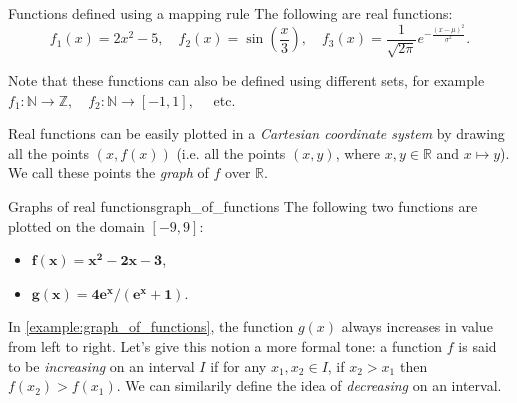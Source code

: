 \begin{example}{Functions defined using a mapping rule}{}
	The following are real functions:
	\[
		f_{1}(x) = 2x^{2}-5,\quad f_{2}(x)=\sin\left( \frac{x}{3} \right),\quad f_{3}(x)=\frac{1}{\sqrt{2\pi}}e^{-\frac{(x-\mu)^{2}}{\sigma^{2}}}.
	\]

	Note that these functions can also be defined using different sets, for example $f_{1}:\mathbb{N}\to\mathbb{Z},\quad f_{2}:\mathbb{N}\to[-1,1],\quad$ etc.
\end{example}

Real functions can be easily plotted in a \emph{Cartesian coordinate system} by drawing all the points $\left( x,f(x) \right)$ (i.e. all the points $\left( x,y \right)$, where $x,y\in\mathbb{R}$ and $x\mapsto y$). We call these points the \emph{graph} of $f$ over $\mathbb{R}$.

\begin{example}{Graphs of real functions}{graph_of_functions}
	The following two functions are plotted on the domain $\left[ -9,9 \right]$:

	\begin{minipage}{0.35\textwidth}
		\begin{itemize}
			\item \textcolor{xred}{$\bm{f(x)=x^{2}-2x-3}$},
			\item \textcolor{xgreen}{$\bm{g(x)=4e^{x}/\left( e^{x}+1 \right)}$}.
		\end{itemize}
	\end{minipage}%
	\begin{minipage}[c]{0.65\textwidth}
		\centering
	\end{minipage}
\end{example}

In \autoref{example:graph_of_functions}, the function $g(x)$ always increases in value from left to right. Let's give this notion a more formal tone: a function $f$ is said to be \emph{increasing} on an interval $I$ if for any $x_{1},x_{2}\in I$, if $x_{2}>x_{1}$ then $f\left( x_{2} \right) > f\left( x_{1} \right)$. We can similarily define the idea of \emph{decreasing} on an interval.

